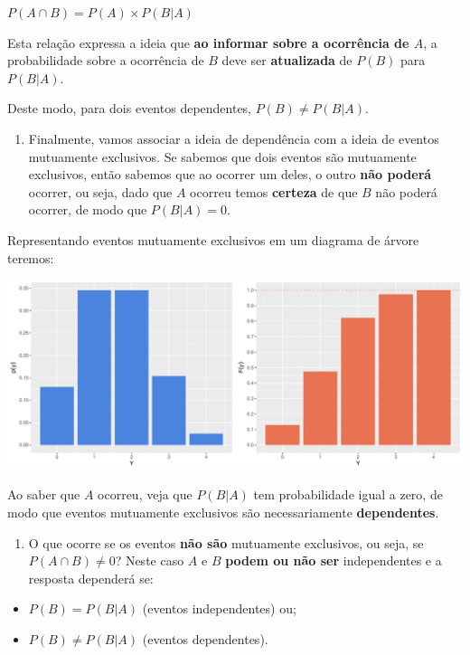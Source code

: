 \documentclass[
]{book}
\providecommand{\tightlist}{%
  \setlength{\itemsep}{0pt}\setlength{\parskip}{0pt}}
\begin{document}
\(P(A \cap B) = P(A) \times P(B|A)\)

Esta relação expressa a ideia que \textbf{ao informar sobre a ocorrência de \(A\)}, a probabilidade sobre a ocorrência de \(B\) deve ser \textbf{atualizada} de \(P(B)\) para \(P(B|A)\).

Deste modo, para dois eventos dependentes, \(P(B) \ne P(B|A)\).

\begin{enumerate}
\def\labelenumi{\arabic{enumi}.}
\setcounter{enumi}{5}
\tightlist
\item
  Finalmente, vamos associar a ideia de dependência com a ideia de eventos mutuamente exclusivos. Se sabemos que dois eventos são mutuamente exclusivos, então sabemos que ao ocorrer um deles, o outro \textbf{não poderá} ocorrer, ou seja, dado que \(A\) ocorreu temos \textbf{certeza} de que \(B\) não poderá ocorrer, de modo que \(P(B|A) = 0\).
\end{enumerate}

Representando eventos mutuamente exclusivos em um diagrama de árvore teremos:

\includegraphics{probest-cambientais_files/figure-latex/unnamed-chunk-197-1.pdf}

Ao saber que \(A\) ocorreu, veja que \(P(B|A)\) tem probabilidade igual a zero, de modo que eventos mutuamente exclusivos são necessariamente \textbf{dependentes}.

\begin{enumerate}
\def\labelenumi{\arabic{enumi}.}
\setcounter{enumi}{6}
\tightlist
\item
  O que ocorre se os eventos \textbf{não são} mutuamente exclusivos, ou seja, se \(P(A \cap B) \ne 0\)? Neste caso \(A\) e \(B\) \textbf{podem ou não ser} independentes e a resposta dependerá se:
\end{enumerate}

\begin{itemize}
\tightlist
\item
  \(P(B) = P(B|A)\) (eventos independentes) ou;
\item
  \(P(B) \ne P(B|A)\) (eventos dependentes).
\end{itemize}
\end{document}
